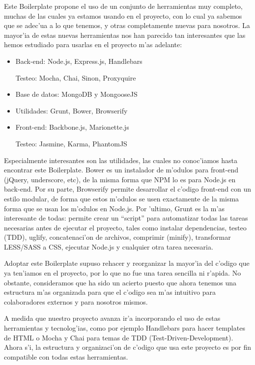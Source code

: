 Este Boilerplate propone el uso de un conjunto de herramientas muy completo, muchas de las cuales ya estamos usando en el proyecto, con lo cual ya sabemos
que se adec'ua a lo que tenemos, y otras completamente nuevas para nosotros. La mayor'ia de estas nuevas herramientas nos han parecido tan interesantes que
las hemos estudiado para usarlas en el proyecto m'as adelante:

\begin{itemize}
 \item Back-end: Node.js, Express.js, Handlebars
 
	Testeo: Mocha, Chai, Sinon, Proxyquire
	
 \item Base de datos: MongoDB y MongooseJS
 
 \item Utilidades: Grunt, Bower, Browserify
 
 \item Front-end: Backbone.js, Marionette.js
 
	Testeo: Jasmine, Karma, PhantomJS
	
\end{itemize}

Especialmente interesantes son las utilidades, las cuales no conoc'iamos hasta encontrar este Boilerplate. Bower es un instalador de m'odulos para front-end
(jQuery, underscore, etc), de la misma forma que NPM lo es para Node.js en back-end. Por su parte, Browserify permite desarrollar el c'odigo front-end con un
estilo modular, de forma que estos m'odulos se usen exactamente de la misma forma que se usan los m'odulos en Node.js. Por 'ultimo, Grunt es la m'as interesante
de todas: permite crear un ``script'' para automatizar todas las tareas necesarias antes de ejecutar el proyecto, tales como instalar dependencias, testeo (TDD),
uglify, concatenaci'on de archivos, comprimir (minify), transformar LESS/SASS a CSS, ejecutar Node.js y cualquier otra tarea necesaria.

Adoptar este Boilerplate supuso rehacer y reorganizar la mayor'ia del c'odigo que ya ten'iamos en el proyecto, por lo que no fue una tarea sencilla ni r'apida.
No obstante, consideramos que ha sido un acierto puesto que ahora tenemos una estructura m'as organizada para que el c'odigo sea m'as intuitivo para colaboradores
externos y para nosotros mismos.

A medida que nuestro proyecto avanza ir'a incorporando el uso de estas herramientas y tecnolog'ias, como por ejemplo Handlebars para hacer templates de HTML o Mocha y Chai
para temas de TDD (Test-Driven-Development). Ahora s'i, la estructura y organizaci'on de c'odigo que usa este proyecto es por fin compatible con todas estas
herramientas.




